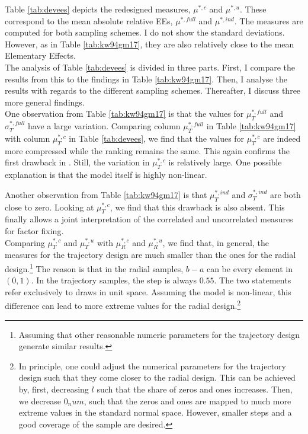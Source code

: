 \noindent
Table \ref{tab:devees} depicts the redesigned measures, $\mu^{*,c}$ and $\mu^{*,u}$. These correspond to the mean absolute relative EEs, $\mu^{*,full}$ and $\mu^{*,ind}$. The measures are computed for both sampling schemes. I do not show the standard deviations. However, as in Table \ref{tab:kw94gm17}, they are also relatively close to the mean Elementary Effects.\\

\noindent
The analysis of Table \ref{tab:devees} is divided in three parts. First, I compare the results from this to the findings in Table \ref{tab:kw94gm17}. Then, I analyse the results with regards to the different sampling schemes. Thereafter, I discuss three more general findings.\\

\noindent
One observation from Table \ref{tab:kw94gm17} is that the values for $\mu^{*,full}_T$ and $\sigma^{*,full}_T$ have a large variation. Comparing column $\mu^{*,full}_T$ in Table \ref{tab:kw94gm17} with column $\mu^{*,c}_T$ in Table \ref{tab:devees}, we find that the values for $\mu^{*,c}_T$ are indeed more compressed while the ranking remains the same. This again confirms the first drawback in \cite{ge2017extending}. Still, the variation in $\mu^{*,c}_T$ is relatively large. One possible explanation is that the model itself is highly non-linear.

Another observation from Table \ref{tab:kw94gm17} is that $\mu^{*,ind}_T$ and $\sigma^{*,ind}_T$ are both close to zero. Looking at $\mu^{*,c}_T$, we find that this drawback is also absent. This finally allows a joint interpretation of the correlated and uncorrelated measures for factor fixing.\\

\noindent
Comparing $\mu^{*,c}_T$ and $\mu^{*,u}_T$ with $\mu^{*,c}_R$ and $\mu^{*,u}_R$, we find that, in general, the measures for the trajectory design are much smaller than the ones for the radial design.\footnote{Assuming that other reasonable numeric parameters for the trajectory design generate similar results.} The reason is that in the radial samples, $b-a$ can be every element in $(0,1)$. In the trajectory samples, the step is always $0.55$. The two statements refer exclusively to draws in unit space. Assuming the model is non-linear, this difference can lead to more extreme values for the radial design.\footnote{In principle, one could adjust the numerical parameters for the trajectory design such that they come closer to the radial design. This can be achieved by, first, decreasing $l$ such that the share of zeros and ones increases. Then, we decrease $0_num$, such that the zeros and ones are mapped to much more extreme values in the standard normal space. However, smaller steps and a good coverage of the sample are desired.}\\

